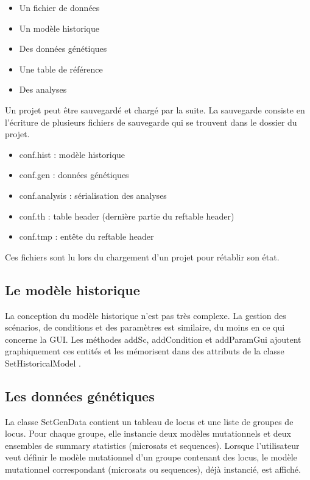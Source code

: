 \documentclass[12pt,a4paper]{article}
\begin{document}
        \begin{itemize}
            \item Un fichier de données
            \item Un modèle historique
            \item Des données génétiques
            \item Une table de référence
            \item Des analyses
        \end{itemize}

        Un projet peut être sauvegardé et chargé par la suite. La sauvegarde
        consiste en l'écriture de plusieurs fichiers de sauvegarde qui se
        trouvent dans le dossier du projet.\\

        \begin{itemize}
            \item conf.hist : modèle historique
            \item conf.gen : données génétiques
            \item conf.analysis : sérialisation des analyses
            \item conf.th : table header (dernière partie du reftable header)
            \item conf.tmp : entête du reftable header
        \end{itemize}

        Ces fichiers sont lu lors du chargement d'un projet pour rétablir son état.

    \subsection{Le modèle historique}
        La conception du modèle historique n'est pas très complexe. La gestion
        des scénarios, de conditions et des paramètres est similaire, du moins
        en ce qui concerne la GUI. Les méthodes addSc, addCondition et
        addParamGui ajoutent graphiquement ces entités et les mémorisent dans
        des attributs de la classe SetHistoricalModel .

    \subsection{Les données génétiques}
        La classe SetGenData contient un tableau de locus et une liste de
        groupes de locus. Pour chaque groupe, elle instancie deux modèles
        mutationnels et deux ensembles de summary statistics (microsats et
        sequences). Lorsque l'utilisateur veut définir le modèle mutationnel
        d'un groupe contenant des locus, le modèle mutationnel correspondant
        (microsats ou sequences), déjà instancié, est affiché.
\end{document}
